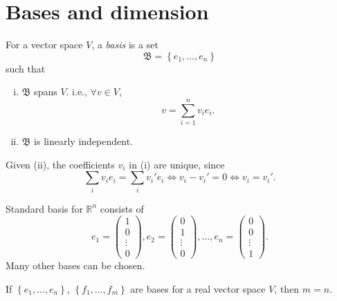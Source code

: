 \documentclass[10pt]{article}
\begin{document}
    \section{Bases and dimension}
    \begin{definition}
        For a vector space $V$, a \textit{basis} is a set 
        \[
            \mathfrak{B}= \left\{ e_1,\dots, e_n\right\}
        \]
        such that 
        \begin{enumerate}[(i)]
            \item $ \mathfrak{B} $ spans $V$. i.e., $ \forall v\in V $, 
            \[
                v = \sum_{i=1}^{n}v_i e_i
            .\]
            \item $ \mathfrak{B} $ is linearly independent.
        \end{enumerate}
        Given (ii), the coefficients $v_i$ in (i) are unique, since 
        \[
            \sum_{i}v_ie_i=\sum_{i}v_i'e_i \Longleftrightarrow v_i-v_i'=0 \Longleftrightarrow v_i=v_i'
        .\]
    \end{definition}
    \begin{example}
        Standard basis for $ \mathbb{R}^n $ consists of 
        \[
            e_1=\begin{pmatrix}
                1\\
                0\\
                \vdots\\
                0
            \end{pmatrix},
            e_2 = \begin{pmatrix}
                0\\
                1\\
                \vdots\\
                0
            \end{pmatrix},
            \dots,
            e_n=\begin{pmatrix}
                0\\
                0\\
                \vdots\\
                1
            \end{pmatrix}
        .\]
        Many other bases can be chosen.
    \end{example}
    \begin{theorem}\label{thm:dimension}
        If $ \left\{ e_1,\dots,e_n\right\} $, $ \left\{ f_1,\dots,f_m\right\} $ are bases for a real vector space $V$, then $m=n$.
    \end{theorem}
\end{document}
